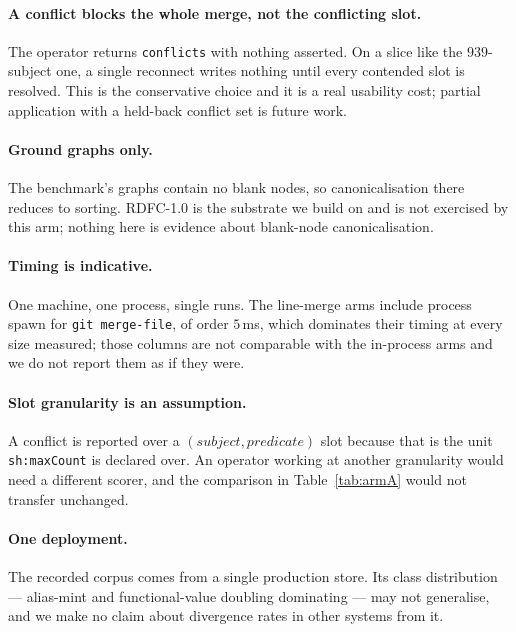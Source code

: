 \paragraph{A conflict blocks the whole merge, not the conflicting slot.} The
operator returns \texttt{conflicts} with nothing asserted. On a slice like the
$939$-subject one, a single reconnect writes nothing until every contended slot
is resolved. This is the conservative choice and it is a real usability cost;
partial application with a held-back conflict set is future work.

\paragraph{Ground graphs only.} The benchmark's graphs contain no blank nodes,
so canonicalisation there reduces to sorting. RDFC-1.0 is the substrate we build
on and is not exercised by this arm; nothing here is evidence about blank-node
canonicalisation.

\paragraph{Timing is indicative.} One machine, one process, single runs. The
line-merge arms include process spawn for \texttt{git merge-file}, of order
$5$\,ms, which dominates their timing at every size measured; those columns are
not comparable with the in-process arms and we do not report them as if they
were.

\paragraph{Slot granularity is an assumption.} A conflict is reported over a
$(subject, predicate)$ slot because that is the unit \texttt{sh:maxCount} is
declared over. An operator working at another granularity would need a different
scorer, and the comparison in Table~\ref{tab:armA} would not transfer unchanged.

\paragraph{One deployment.} The recorded corpus comes from a single production
store. Its class distribution --- alias-mint and functional-value doubling
dominating --- may not generalise, and we make no claim about divergence rates
in other systems from it.


